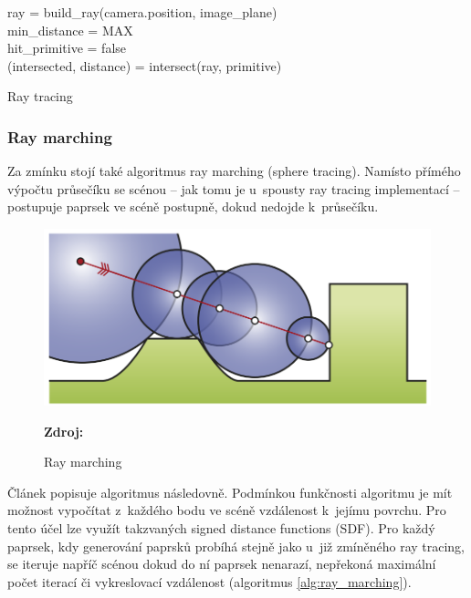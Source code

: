 \begin{center}
	\begin{czechalgorithm}[H] \label{alg:rt_1}
		ray = build\_ray(camera.position, image\_plane)\\
		min\_distance = MAX\\
		hit\_primitive = false\\
		 {
			(intersected, distance) = intersect(ray, primitive)\\
		}
		\caption{Ray tracing}
	\end{czechalgorithm}
\end{center}

\subsubsection{Ray marching}
Za zmínku stojí také algoritmus ray marching (sphere tracing). Namísto přímého výpočtu průsečíku se scénou -- jak tomu je u~spousty ray tracing implementací -- postupuje paprsek ve scéně postupně, dokud nedojde k~průsečíku.

\begin{figure}[H]
	\centering
	\includegraphics[scale=0.8]{obrazky-figures/ray_marching.png}
	\caption{Ray marching}
	\textbf{Zdroj: \cite{Keinert2014EnhancedST}}
	\label{fig:ray_marching}
\end{figure}

Článek \cite{sphere_tracing} popisuje algoritmus následovně. Podmínkou funkčnosti algoritmu je mít možnost vypočítat z~každého bodu ve scéně vzdálenost k~jejímu povrchu. Pro tento účel lze využít takzvaných signed distance functions (SDF). Pro každý paprsek, kdy generování paprsků probíhá stejně jako u~již zmíněného ray tracing, se iteruje napříč scénou dokud do ní paprsek nenarazí, nepřekoná maximální počet iterací či vykreslovací vzdálenost (algoritmus \ref{alg:ray_marching}).


